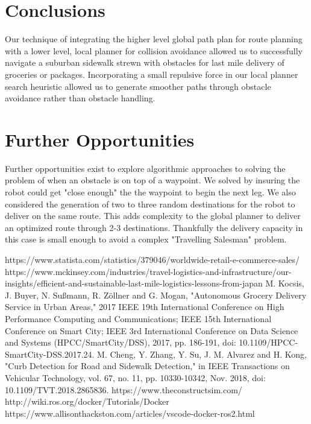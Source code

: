 \documentclass{article}
\begin{document}
\begin{multicols}{2}
\section*{Conclusions}
\noindent Our technique of integrating the higher level global path plan for route planning with a lower level, local planner for collision avoidance allowed us to successfully navigate a suburban sidewalk strewn with obstacles for last mile delivery of groceries or packages.  Incorporating a small repulsive force in our local planner search heuristic allowed us to generate smoother paths through obstacle avoidance rather than obstacle handling.  

\section*{Further Opportunities}
\noindent Further opportunities exist to explore algorithmic approaches to solving the problem of when an obstacle is on top of a waypoint.  We solved by  insuring the robot could get "close enough" the the waypoint to begin the next leg.  We also considered the generation of two to three random destinations for the robot to deliver on the same route.  This adds complexity to the global planner to deliver an optimized route through 2-3 destinations.  Thankfully the delivery capacity in this case is small enough to avoid a complex "Travelling Salesman" problem.
\label{References}


\begin{thebibliography}{10}
 https://www.statista.com/statistics/379046/worldwide-retail-e-commerce-sales/
https://www.mckinsey.com/industries/travel-logistics-and-infrastructure/our-insights/efficient-and-sustainable-last-mile-logistics-lessons-from-japan
M. Kocsis, J. Buyer, N. Sußmann, R. Zöllner and G. Mogan, "Autonomous Grocery Delivery Service in Urban Areas," 2017 IEEE 19th International Conference on High Performance Computing and Communications; IEEE 15th International Conference on Smart City; IEEE 3rd International Conference on Data Science and Systems (HPCC/SmartCity/DSS), 2017, pp. 186-191, doi: 10.1109/HPCC-SmartCity-DSS.2017.24.
M. Cheng, Y. Zhang, Y. Su, J. M. Alvarez and H. Kong, "Curb Detection for Road and Sidewalk Detection," in IEEE Transactions on Vehicular Technology, vol. 67, no. 11, pp. 10330-10342, Nov. 2018, doi: 10.1109/TVT.2018.2865836.
 https://www.theconstructsim.com/
 http://wiki.ros.org/docker/Tutorials/Docker
 https://www.allisonthackston.com/articles/vscode-docker-ros2.html




\end{thebibliography}
\end{multicols}
\end{document}
